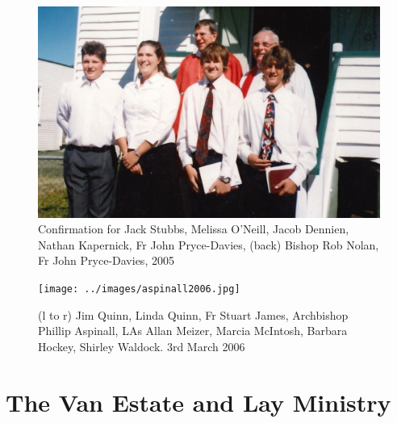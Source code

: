 \begin{figure}[!htb]
\begin{center}
\includegraphics[width=1.\textwidth,center]{../images/confirmation2005.jpg}
\caption{Confirmation for Jack Stubbs, Melissa O'Neill, Jacob Dennien, Nathan Kapernick, Fr John Pryce-Davies, (back) Bishop Rob Nolan, Fr John Pryce-Davies, 2005}
\end{center}
\end{figure}










\begin{figure}[!htb]
\begin{center}
\texttt{[image: ../images/aspinall2006.jpg]}
\caption{(l to r) Jim Quinn, Linda Quinn, Fr Stuart James, Archbishop Phillip Aspinall, LAs Allan Meizer, Marcia McIntosh, Barbara Hockey, Shirley Waldock. 3rd March 2006}
\end{center}
\end{figure}




\section{The Van Estate and Lay Ministry}



